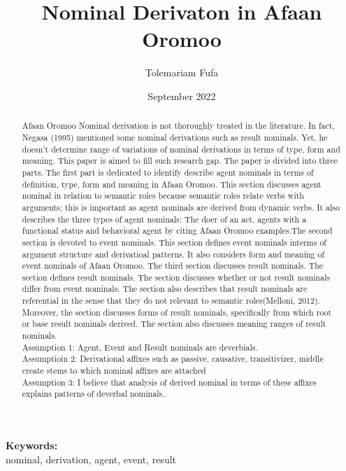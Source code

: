 \documentclass[11pt,a4paper]{article}
\title {Nominal Derivaton in Afaan Oromoo}
\author {Tolemariam Fufa}
\date{September 2022}
\begin{document}
\newcommand\keywords[1]{%
	\begingroup
	\let\and\\
	\par
	\noindent\textbf{Keywords:}\\#1\par
	\endgroup
}
\maketitle
\begin{abstract}
	Afaan Oromoo Nominal derivation is not thoroughly treated in the literature. In fact, Negasa (1995) mentioned some nominal derivations such as result nominals. Yet, he doesn’t determine range of variations of nominal derivations in terms of type, form and meaning. This paper is aimed to fill such research gap. The paper is divided into three parts. The first part is dedicated to identify describe agent nominals in terms of definition, type, form and meaning in Afaan Oromoo. This section discusses agent nominal in relation to semantic roles because semantic roles relate verbs with arguments; this is important as agent nominals are derived from dynamic verbs. It also describes the three types of agent nominals: The doer of an act, agents with a functional status and behavioral agent by citing Afaan Oromoo examples.The second section is devoted to event nominals. This section defines event nominals interms of argument structure and derivatioal patterns. It also considers form and meaning of event nominals of Afaan Oromoo. The third section discusses result nominals. The section defines result nominals. The section discusses whether or not result nominals differ from event nominals. The section also describes that result nominals are referential in the sense that they do not relevant to semantic roles(Melloni, 2012). Moreover, the section discusses forms of result nominals, specifically from which root or base result nominals derived. The section also discusses meaning ranges of result nominals.\\
		
	Assumption 1: Agent, Event and Result nominals are deverbials.\\
	Assumptioin 2: Derivational affixes such as passive, causative, transitivizer, middle create stems to which nominal affixes are attached\\
	Assumption 3: I believe that analysis of derived nominal in terms of these affixes explains patterns of deverbal nominals. \\
	
\end{abstract}
\keywords{nominal, derivation, agent, event, result}
\newpage
\end{document}
